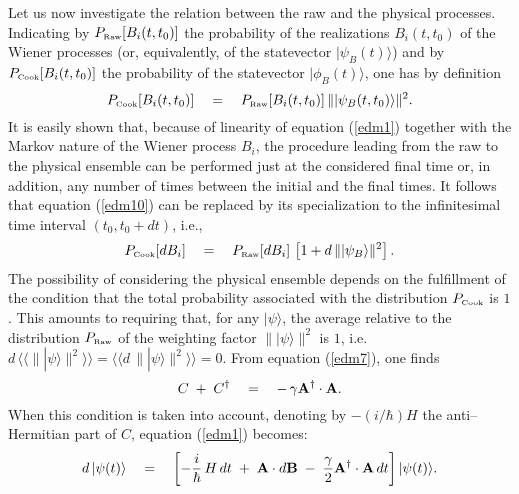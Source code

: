 \documentclass[12pt]{article}
\newcommand{\llangle}{\langle\!\langle}
\newcommand{\rrangle}{\rangle\!\rangle}
\begin{document}
Let us now investigate the relation between the raw and the
physical processes. Indicating by $P_{\makebox{\tiny
Raw}}[B_{i}(t, t_{0})]$ the probability of the realizations
$B_{i}(t, t_{0})$ of the Wiener processes (or, equivalently, of
the statevector $|\psi_{B}(t)\rangle$) and by $P_{\makebox{\tiny
Cook}}[B_{i}(t,t_{0})]$ the probability of the statevector
$|\phi_{B}(t)\rangle$, one has by definition
\begin{equation} \label{edm10}
P_{\makebox{\tiny Cook}}[B_{i}(t,t_{0})] \quad = \quad
P_{\makebox{\tiny Raw}}[B_{i}(t, t_{0})]\, \| |\psi_{B}(t,
t_{0})\rangle\|^{2}.
\end{equation}
It is easily shown that, because of linearity of equation
(\ref{edm1}) together with the Markov nature of the Wiener process
$B_{i}$, the procedure leading from the raw to the physical
ensemble can be performed just at the considered final time or, in
addition, any number of times between the initial and the final
times. It follows that equation (\ref{edm10}) can be replaced by
its specialization to the infinitesimal time interval $(t_{0},
t_{0} + dt)$, i.e.,
\begin{equation} \label{edm8}
P_{\makebox{\tiny Cook}}[dB_{i}] \quad = \quad P_{\makebox{\tiny
Raw}}[dB_{i}]\, \left[ 1 + d\, \| |\psi_{B}\rangle\|^{2} \right].
\end{equation}
The possibility of considering the physical ensemble depends on
the fulfillment of the condition that the total probability
associated with the distribution $P_{\makebox{\tiny Cook}}$ is
$1$. This amounts to requiring that, for any $|\psi\rangle$, the
average relative to the distribution $P_{\makebox{\tiny Raw}}$ of
the weighting factor $\| |\psi\rangle \|^2$ is $1$, i.e. $d \,
\llangle\| |\psi\rangle \|^2\rrangle = \llangle d \, \|
|\psi\rangle \|^2\rrangle = 0$. From equation (\ref{edm7}), one
finds
\begin{equation} \label{aqnld}
C\; + \; C^{\dagger} \quad = \quad -\, \gamma {\bf
A}^{\dagger}\cdot {\bf A}.
\end{equation}
When this condition is taken into account, denoting by
$-(i/\hbar)H$ the anti--Hermitian part of $C$, equation
(\ref{edm1}) becomes:
\begin{equation} \label{imef}
d\, |\psi(t)\rangle \quad = \quad \left[ -\frac{i}{\hbar}\, H\,dt
\; + \; {\bf A}\cdot d{\bf B} \; - \; \frac{\gamma}{2} {\bf
A}^{\dagger}\cdot {\bf A}\,dt \right] |\psi(t)\rangle.
\end{equation}
\end{document}
